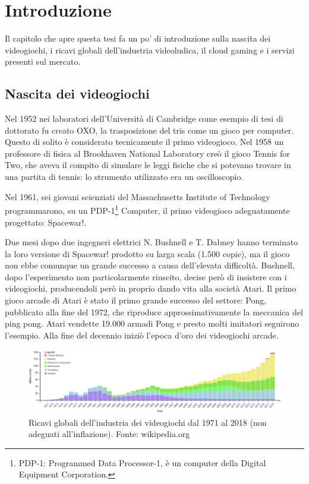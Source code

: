 %
%

\chapter{Introduzione}
\label{cap:Introduzione}

Il capitolo che apre questa tesi fa un po' di introduzione sulla nascita dei videogiochi, i ricavi globali dell'industria videoludica, il cloud gaming e i servizi presenti sul mercato.

\section{Nascita dei videogiochi}

Nel 1952 nei laboratori dell'Università di Cambridge come esempio di tesi di dottorato fu creato OXO, la trasposizione del tris come un gioco per computer. Questo di solito è considerato tecnicamente il primo videogioco. Nel 1958 un professore di fisica al Brookhaven National Laboratory creò il gioco Tennis for Two, che aveva il compito di simulare le leggi fisiche che si potevano trovare in una partita di tennis: lo strumento utilizzato era un oscilloscopio.

Nel 1961, sei giovani scienziati del Massachusetts Institute of Technology programmarono, su un PDP-1\footnote{PDP-1: Programmed Data Processor-1, è un computer della Digital Equipment Corporation.} Computer, il primo videogioco adeguatamente progettato: Spacewar!.

Due mesi dopo due ingegneri elettrici N. Bushnell e T. Dabney hanno terminato la loro versione di Spacewar! prodotto su larga scala (1.500 copie), ma il gioco non ebbe comunque un grande successo a causa dell'elevata difficoltà. Bushnell, dopo l'esperimento non particolarmente riuscito, decise però di insistere con i videogiochi, producendoli però in proprio dando vita alla società Atari. Il primo gioco arcade di Atari è stato il primo grande successo del settore: Pong, pubblicato alla fine del 1972, che riproduce approssimativamente la meccanica del ping pong. Atari vendette 19.000 armadi Pong e presto molti imitatori seguirono l'esempio. Alla fine del decennio iniziò l'epoca d'oro dei videogiochi arcade.

\begin{figure}[H]
	\includegraphics[width=\linewidth]{immagini/valore_commerciale_giochi_globale.png}
	\caption{Ricavi globali dell'industria dei videogiochi dal 1971 al 2018 (non adeguati all'inflazione). Fonte: wikipedia.org}
	\label{fig:valore_commerciale_giochi_globale}
\end{figure}

